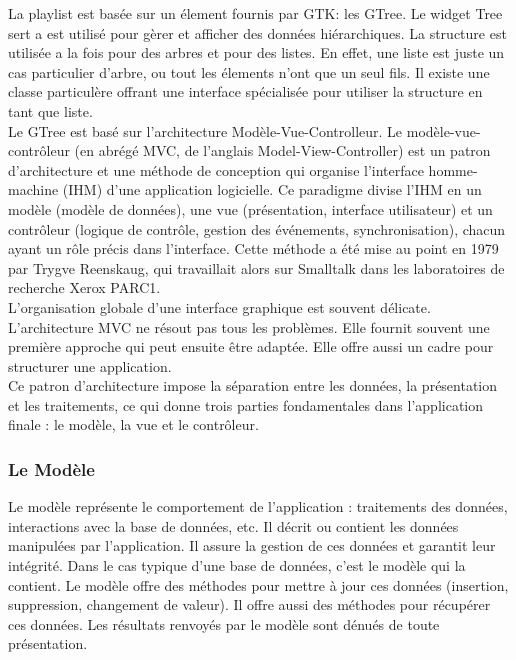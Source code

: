 \documentclass[12pt,a4paper]{report}
\begin{document}
La playlist est basée sur un élement fournis par GTK: les GTree. Le widget Tree sert a est utilisé pour gèrer et afficher des données hiérarchiques. La structure est utilisée a la fois pour des arbres et pour des listes. En effet, une liste est juste un cas particulier d'arbre, ou tout les élements n'ont que un seul fils. Il existe une classe particulère offrant une interface spécialisée pour utiliser la structure en tant que liste.\\

Le GTree est basé sur l'architecture Modèle-Vue-Controlleur. Le modèle-vue-contrôleur (en abrégé MVC, de l'anglais Model-View-Controller) est un patron d'architecture et une méthode de conception qui organise l'interface homme-machine (IHM) d'une application logicielle. Ce paradigme divise l'IHM en un modèle (modèle de données), une vue (présentation, interface utilisateur) et un contrôleur (logique de contrôle, gestion des événements, synchronisation), chacun ayant un rôle précis dans l'interface. Cette méthode a été mise au point en 1979 par Trygve Reenskaug, qui travaillait alors sur Smalltalk dans les laboratoires de recherche Xerox PARC1.\\

L'organisation globale d'une interface graphique est souvent délicate. L'architecture MVC ne résout pas tous les problèmes. Elle fournit souvent une première approche qui peut ensuite être adaptée. Elle offre aussi un cadre pour structurer une application.\\

Ce patron d'architecture impose la séparation entre les données, la présentation et les traitements, ce qui donne trois parties fondamentales dans l'application finale : le modèle, la vue et le contrôleur. \\

\subsubsection{Le Modèle}

Le modèle représente le comportement de l'application : traitements des données, interactions avec la base de données, etc. Il décrit ou contient les données manipulées par l'application. Il assure la gestion de ces données et garantit leur intégrité. Dans le cas typique d'une base de données, c'est le modèle qui la contient. Le modèle offre des méthodes pour mettre à jour ces données (insertion, suppression, changement de valeur). Il offre aussi des méthodes pour récupérer ces données. Les résultats renvoyés par le modèle sont dénués de toute présentation.\\
\end{document}
